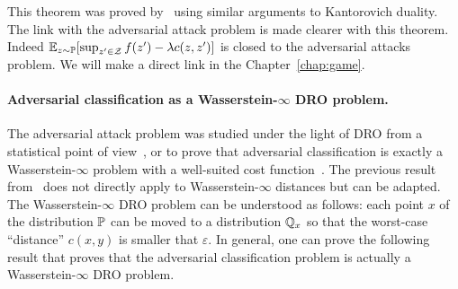 This theorem was proved by~\citep{blanchet2019quantifying} using similar arguments to Kantorovich duality. The link with the adversarial attack problem is made clearer with this theorem. Indeed $\mathbb{E}_{z\sim\PP}\left[\sup_{z'\in\ZZ}f(z')-\lambda c(z,z')\right]$ is closed to the adversarial attacks problem. We will make a direct link in the Chapter~\ref{chap:game}. %


\paragraph{Adversarial classification as a Wasserstein-$\infty$ DRO problem.} The adversarial attack problem was studied under the light of DRO from a statistical point of view~\citep{raghunathan2018certified}, or to prove that adversarial classification is exactly a Wasserstein-$\infty$ problem with a well-suited cost function~\citep{pydi2019adversarial}. The previous result from~\citep{blanchet2019quantifying} does not directly apply to Wasserstein-$\infty$ distances but can be adapted. The Wasserstein-$\infty$ DRO problem can be understood as follows: each point $x$ of the distribution $\mathbb{P}$ can be moved to a distribution $\mathbb{Q}_x$ so that the worst-case ``distance'' $c(x,y)$ is smaller that $\varepsilon$. In general, one can prove the following result that proves that the adversarial classification problem is actually a Wasserstein-$\infty$ DRO problem.

